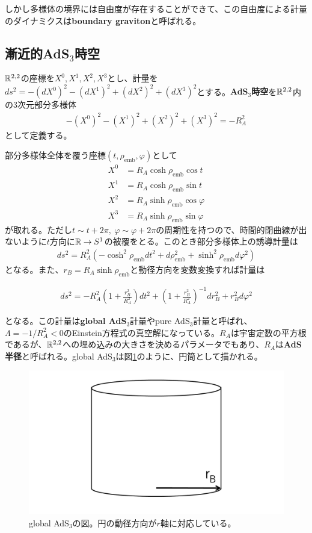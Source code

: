 しかし多様体の境界には自由度が存在することができて、この自由度による計量のダイナミクスは\textbf{boundary graviton}と呼ばれる。

\subsection{漸近的AdS$_3$時空}
\begin{oframed}
$\mathbb{R}^{2,2}$の座標を$X^0,X^1,X^2,X^3$とし、計量を$ds^2=-(dX^0)^2-(dX^1)^2+(dX^2)^2+(dX^3)^2$とする。\textbf{AdS$_3$時空}を$\mathbb{R}^{2,2}$内の$3$次元部分多様体
\begin{align}
-(X^0)^2-(X^1)^2+(X^2)^2+(X^3)^2=-R_A^2
\end{align}
として定義する。
\end{oframed}

部分多様体全体を覆う座標$(t,\rho_\text{emb},\varphi)$として
\begin{align}
X^0&=R_A \cosh\rho_\text{emb} \cos t\\
X^1&=R_A \cosh\rho_\text{emb} \sin t\\
X^2&=R_A \sinh\rho_\text{emb} \cos \varphi\\
X^3&=R_A \sinh\rho_\text{emb} \sin \varphi
\end{align}
が取れる。ただし$t\sim t+2\pi,\  \varphi\sim \varphi+2\pi$の周期性を持つので、時間的閉曲線が出ないように$t$方向に$\mathbb{R}\to S^1$の被覆をとる。このとき部分多様体上の誘導計量は
\begin{align}
ds^2=R_A^2 (-\cosh^2 \rho_\text{emb} dt^2+d\rho_\text{emb}^2+\sinh^2\rho_\text{emb}d\varphi^2)
\end{align}
となる。また、$r_{B}=R_A\sinh\rho_\text{emb}$と動径方向を変数変換すれば計量は
\begin{oframed}
\begin{align}\label{globalAdS}
ds^2=-R_A^2\left(1+\frac{r_{B}^2}{R_A^2}\right)dt^2+\left(1+\frac{r_{B}^2}{R_A^2}\right)^{-1}dr_{B}^2+r_{B}^2d\varphi^2
\end{align}
\end{oframed}

となる。この計量は\textbf{global AdS$_3$}計量やpure AdS$_3$計量と呼ばれ、$\Lambda=-1/R_A ^2<0$のEinstein方程式の真空解になっている。$R_A$は宇宙定数の平方根であるが、$\mathbb{R}^{2,2}$への埋め込みの大きさを決めるパラメータでもあり、$R_A$は\textbf{AdS半径}と呼ばれる。global AdS$_3$は図\ref{fig:globalads}のように、円筒として描かれる。
\begin{figure}[h]
	\centering
	\includegraphics[width=0.7\linewidth]{globalAdS.pdf}
	\caption{global AdS$_3$の図。円の動径方向が$r$軸に対応している。}
	\label{fig:globalads}
\end{figure}

